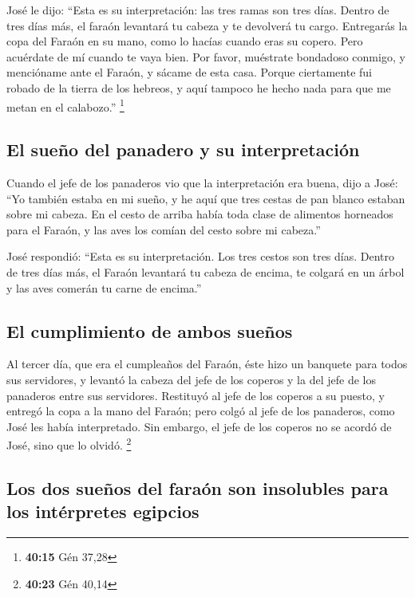  José le dijo: ``Esta es su interpretación: las tres
ramas son tres días.  Dentro de tres días más, el faraón
levantará tu cabeza y te devolverá tu cargo. Entregarás la copa del
Faraón en su mano, como lo hacías cuando eras su copero. 
Pero acuérdate de mí cuando te vaya bien. Por favor, muéstrate bondadoso
conmigo, y mencióname ante el Faraón, y sácame de esta casa.
 Porque ciertamente fui robado de la tierra de los
hebreos, y aquí tampoco he hecho nada para que me metan en el
calabozo.'' \footnote{\textbf{40:15} Gén 37,28}

\hypertarget{el-sueuxf1o-del-panadero-y-su-interpretaciuxf3n}{%
\subsection{El sueño del panadero y su
interpretación}\label{el-sueuxf1o-del-panadero-y-su-interpretaciuxf3n}}

 Cuando el jefe de los panaderos vio que la
interpretación era buena, dijo a José: ``Yo también estaba en mi sueño,
y he aquí que tres cestas de pan blanco estaban sobre mi cabeza.
 En el cesto de arriba había toda clase de alimentos
horneados para el Faraón, y las aves los comían del cesto sobre mi
cabeza.''

 José respondió: ``Esta es su interpretación. Los tres
cestos son tres días.  Dentro de tres días más, el Faraón
levantará tu cabeza de encima, te colgará en un árbol y las aves comerán
tu carne de encima.''

\hypertarget{el-cumplimiento-de-ambos-sueuxf1os}{%
\subsection{El cumplimiento de ambos
sueños}\label{el-cumplimiento-de-ambos-sueuxf1os}}

 Al tercer día, que era el cumpleaños del Faraón, éste
hizo un banquete para todos sus servidores, y levantó la cabeza del jefe
de los coperos y la del jefe de los panaderos entre sus servidores.
 Restituyó al jefe de los coperos a su puesto, y entregó
la copa a la mano del Faraón;  pero colgó al jefe de los
panaderos, como José les había interpretado.  Sin
embargo, el jefe de los coperos no se acordó de José, sino que lo
olvidó. \footnote{\textbf{40:23} Gén 40,14}

\hypertarget{los-dos-sueuxf1os-del-farauxf3n-son-insolubles-para-los-intuxe9rpretes-egipcios}{%
\subsection{Los dos sueños del faraón son insolubles para los
intérpretes
egipcios}\label{los-dos-sueuxf1os-del-farauxf3n-son-insolubles-para-los-intuxe9rpretes-egipcios}}

